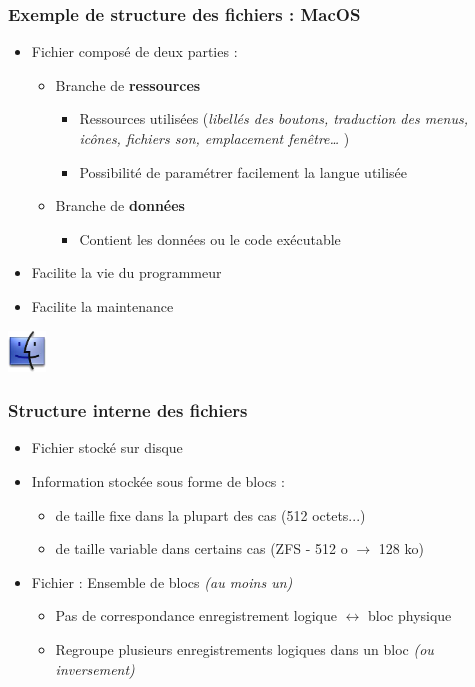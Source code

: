 \begin{frame}
\frametitle{Exemple de structure des fichiers : \textbf{MacOS}}
\begin{itemize}
\item Fichier composé de deux parties :
\begin{itemize}
\item Branche de \textbf{ressources}
\begin{itemize}
\item Ressources utilisées (\textit{libellés des boutons, traduction des menus, icônes, fichiers son, emplacement fenêtre… })
\item Possibilité de paramétrer facilement la langue utilisée
\end{itemize}
\item Branche de \textbf{données}
\begin{itemize}
\item Contient les données ou le code exécutable
\end{itemize}
\end{itemize}
\item Facilite la vie du programmeur
\item Facilite la maintenance
\end{itemize}
\includegraphics[width=1cm]{../illustration/logo_macos.png}
\end{frame}

\begin{frame}
\frametitle{Structure interne des fichiers}
\begin{itemize}
\item Fichier stocké sur disque
\item Information stockée sous forme de blocs :
\begin{itemize}
\item de taille fixe dans la plupart des cas (512 octets...)
\item de taille variable dans certains cas (ZFS - 512 o $\rightarrow$ 128 ko)
\end{itemize}
\item Fichier : Ensemble de blocs \textit{(au moins un)}
\begin{itemize}
\item Pas de correspondance enregistrement logique $\leftrightarrow$ bloc physique
\item Regroupe plusieurs enregistrements logiques dans un bloc \textit{(ou inversement)}
\end{itemize}
\end{itemize}
\end{frame}

